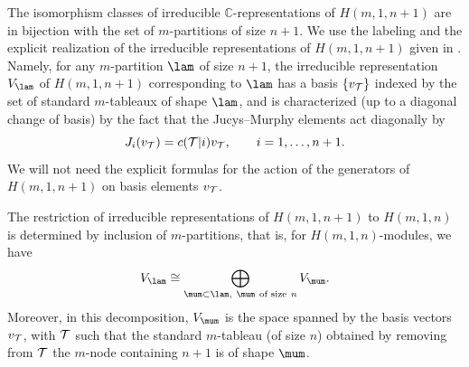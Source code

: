 The isomorphism classes of irreducible $\mathbb{C}$-representations of $H(m,1,n+1)$ are in bijection with the set of $m$-partitions of size $n+1$.
We use the labeling and the explicit realization of the irreducible representations of $H(m,1,n+1)$ given in \cite{AK}. Namely, for any $m$-partition $\lam$ of size $n+1$, the irreducible representation $V_{\lam}$ of $H(m,1,n+1)$ corresponding to $\lam$ has a basis $\{v_{{\cal{T}}}\}$ indexed by the set of standard $m$-tableaux of shape $\lam$, and is characterized (up to a diagonal change of basis) by the fact that the Jucys--Murphy elements act diagonally by
\[
J_i(v_{{\cal{T}}})=c({\cal{T}}|i) v_{{\cal{T}}}  ,\qquad  i=1,\dots,n+1.
\]
We will not need the explicit formulas for the action of the generators of $H(m,1,n+1)$ on basis elements $v_{{\cal{T}}}$.

The restriction of irreducible  representations of $H(m,1,n+1)$ to $H(m,1,n)$ is determined
by inclusion of $m$-partitions, that is, for $H(m,1,n)$-modules, we have
\begin{gather}\label{Res}
V_{\lam}\cong\bigoplus_{\mum\subset\lam ,\ \mum\ \text{of size}\ n} V_{\mum}  .
\end{gather}
Moreover, in this decomposition, $V_{\mum}$ is the space spanned by the basis vectors $v_{{\cal{T}}}$, with ${\cal{T}}$ such that the standard $m$-tableau (of size $n$) obtained by removing from ${\cal{T}}$ the $m$-node containing $n+1$  is of shape $\mum$.


